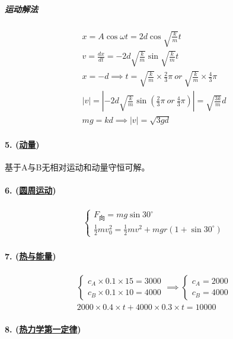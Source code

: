 \subparagraph{运动解法}

\begin{gather*}
    x=A\cos\omega t=2d\cos\sqrt{\frac{k}{m}}t\\
    v=\frac{dx}{dt}=-2d\sqrt{\frac{k}{m}}\sin\sqrt{\frac{k}{m}}t\\
    x=-d\implies t=\sqrt{\frac{k}{m}}\times\frac23\pi\ or\ \sqrt{\frac{k}{m}}\times\frac43\pi\\
    |v|=\left|-2d\sqrt{\frac{k}{m}}\sin\left(\frac23\pi\ or\ \frac43\pi\right)\right|=\sqrt{\frac{3k}{m}}d\\
    mg=kd\implies|v|=\sqrt{3gd}
\end{gather*}

\paragraph{5. (\hyperref[subsec:动量]{动量})} 基于A与B无相对运动和动量守恒可解。
\paragraph{6. (\hyperref[subsec:圆周运动]{圆周运动})}

\begin{gather*}
    \begin{cases}
        F_\textrm{向}=mg\sin30^\circ\\
        \frac12mv_0^2=\frac12mv^2+mgr(1+\sin30^\circ)
    \end{cases}
\end{gather*}

\paragraph{7. (\hyperref[sec:热与能量]{热与能量})}

\begin{gather*}
    \begin{cases}
        c_A\times0.1\times15=3000\\
        c_B\times0.1\times10=4000
    \end{cases}\implies
    \begin{cases}
        c_A=2000\\
        c_B=4000
    \end{cases}\\
    2000\times0.4\times t+4000\times0.3\times t=10000
\end{gather*}

\paragraph{8. (\hyperref[subsec:热力学第一定律]{热力学第一定律})}

